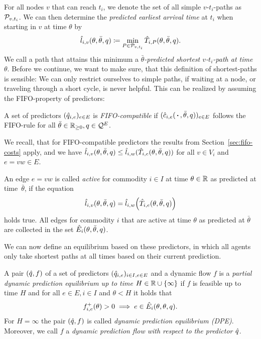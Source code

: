 For all nodes $v$ that can reach $t_i$, we denote the set of all simple $v$-$t_i$-paths as $\mathcal{P}_{v,t_i}$.
We can then determine the \emph{predicted earliest arrival time} at $t_i$ when starting in $v$ at time $\theta$ by
\[
    \hat l_{i,v}(\theta, \bar\theta, q) \coloneqq \min_{P \in \mathcal{P}_{v,t_i}} \hat T_{i, P}(\theta,\bar\theta, q).
\]
We call a path that attains this minimum a \emph{$\bar\theta$-predicted shortest $v$-$t_i$-path at time $\theta$}.
Before we continue, we want to make sure, that this definition of shortest-paths is sensible:
We can only restrict ourselves to simple paths, if waiting at a node, or traveling through a short cycle, is never helpful.
This can be realized by assuming the FIFO-property of predictors:
\begin{definition}
    A set of predictors $(\hat q_{i,e})_{e\in E}$ is \emph{FIFO-compatible} if $(\hat c_{i,e}(\,\boldsymbol{\cdot}\,, \bar\theta, q))_{e\in E}$ follows the FIFO-rule for all $\bar\theta\in\mathbb{R}_{\geq0}, q\in\mathcal{Q}^E$.
\end{definition}

We recall, that for FIFO-compatible predictors the results from Section~\ref{sec:fifo-costs} apply, and we have $\hat l_{i,v}(\theta, \bar\theta, q) \leq \hat l_{i,w}{(
    \hat T_{i, e}(\theta, \bar\theta, q)
)}$
for all $v\in V_i$ and $e=vw\in E$.

\begin{definition}
An edge $e=vw$ is called \emph{active} for commodity $i\in I$ at time $\theta\in\mathbb{R}$ as predicted at time~$\bar\theta$, if the equation \[
    \hat l_{i,v}(\theta, \bar\theta, q) = \hat l_{i,w}{\left(
        \hat T_{i, e}(\theta, \bar\theta, q)
    \right)}
\]
holds true.
All edges for commodity $i$ that are active at time $\theta$ as predicted at $\bar\theta$ are collected in the set $\hat E_i(\theta, \bar\theta, q)$. 
\end{definition}

We can now define an equilibrium based on these predictors, in which all agents only take shortest paths at all times based on their current prediction.
\begin{definition}
    A pair $(\hat q, f)$ of a set of predictors $(\hat q_{i,e})_{i\in I, e\in E}$ and a dynamic flow $f$ is a \emph{partial dynamic prediction equilibrium up to time $H\in\mathbb{R}\cup\{\infty\}$} if $f$ is feasible up to time $H$ and for all $e\in E, i\in I$ and $\theta < H$ it holds that
    \[
        {f}^+_{i,e}(\theta) > 0 \implies e \in \hat E_i(\theta, \theta, q).
    \]
    For $H = \infty$ the pair $(\hat q, f)$ is called \emph{dynamic prediction equilibrium (DPE)}. 
    Moreover, we call $f$ a \emph{dynamic prediction flow with respect to the predictor $\hat q$}. 

\end{definition}

